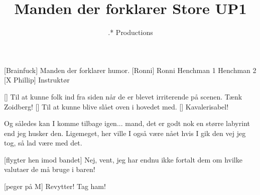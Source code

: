 \documentclass[a4paper,11pt]{article}
\title{Manden der forklarer Store UP1}
\author{.* Productions}
\begin{document}
 \maketitle

 \begin{roles}
[Brainfuck] Manden der forklarer humor.
[Ronni] Ronni
 Henchman 1
 Henchman 2
[X Phillip] Instruktør
 \end{roles}
 
 \begin{props}
[] Til at kunne folk ind fra siden når de er blevet irriterende på scenen.  Tænk Zoidberg!
[] Til at kunne blive slået oven i hovedet med.
[] Kavalerisabel!
 \end{props}

 \begin{sketch}
 

 Og således kan I komme tilbage igen...  mand, det er godt nok en større labyrint end jeg husker den.  Ligemeget, her ville I også være nået hvis I gik den vej jeg tog, så lad være med det.


[flygter hen imod bandet] Nej, vent, jeg har endnu ikke fortalt dem om hvilke valutaer de må bruge i baren!


[peger på M] Revytter!  Tag ham!


 \end{sketch}
\end{document}
